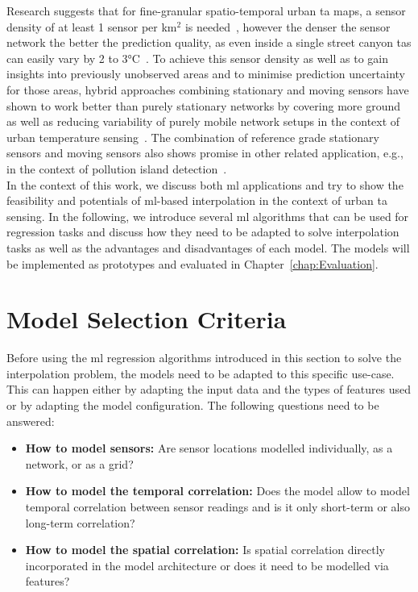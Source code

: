 Research suggests that for fine-granular spatio-temporal urban \gls{ta} maps, a sensor density of at least 1 sensor per km$^{2}$ is needed~\cite{venter2020hyperlocal}, however the denser the sensor network the better the prediction quality, as even inside a single street canyon \gls{ta}s can easily vary by 2 to 3°C~\cite{sugawara2008temperature}.
To achieve this sensor density as well as to gain insights into previously unobserved areas and to minimise prediction uncertainty for those areas, hybrid approaches combining stationary and moving sensors have shown to work better than purely stationary networks by covering more ground as well as reducing variability of purely mobile network setups in the context of urban temperature sensing~\cite{yang2019designing}. The combination of reference grade stationary sensors and moving sensors also shows promise in other related application, e.g., in the context of pollution island detection~\cite{iyer2022modeling}.\\
In the context of this work, we discuss both \gls{ml} applications and try to show the feasibility and potentials of \gls{ml}-based interpolation in the context of urban \gls{ta} sensing.
In the following, we introduce several \gls{ml} algorithms that can be used for regression tasks and discuss how they need to be adapted to solve interpolation tasks as well as the advantages and disadvantages of each model. The models will be implemented as prototypes and evaluated in Chapter~\ref{chap:Evaluation}.

\section{Model Selection Criteria}
\label{sec: model selection criteria}

Before using the \gls{ml} regression algorithms introduced in this section to solve the interpolation problem, the models need to be adapted to this specific use-case. This can happen either by adapting the input data and the types of features used or by adapting the model configuration. The following questions need to be answered:

\begin{itemize}
    \item \textbf{How to model sensors:} Are sensor locations modelled individually, as a network, or as a grid?
    \item \textbf{How to model the temporal correlation:} Does the model allow to model temporal correlation between sensor readings and is it only short-term or also long-term correlation?
    \item \textbf{How to model the spatial correlation:} Is spatial correlation directly incorporated in the model architecture or does it need to be modelled via features?
\end{itemize}

